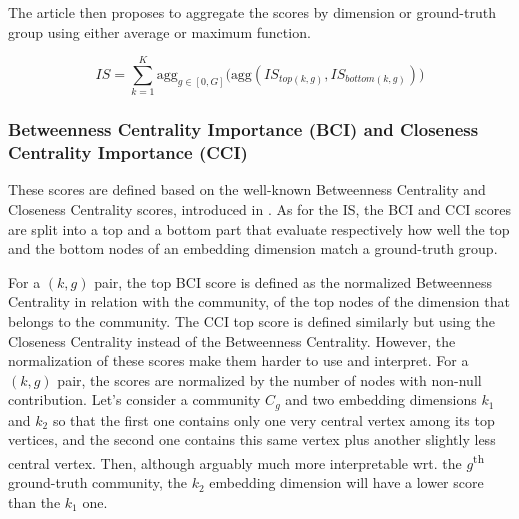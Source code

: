 The article then proposes to aggregate the scores by dimension or ground-truth group using either average or maximum function. %

\begin{equation}
    IS = \sum_{k=1}^K \text{agg}_{g \in [0, G]}\big(\text{agg}(IS_{top(k,g)}, IS_{bottom(k,g)})\big)
\end{equation}

\subsubsection{Betweenness Centrality Importance (BCI) and Closeness Centrality Importance (CCI)}\label{subsec:bci_cci_introduction}
These scores are defined based on the well-known Betweenness Centrality and Closeness Centrality scores, introduced in \cite{bloch2023centrality}.  As for the IS, the BCI and CCI scores are split into a top and a bottom part that evaluate respectively how well the top and the bottom nodes of an embedding dimension match a ground-truth group.

For a $(k, g)$ pair, the top BCI score is defined as the normalized Betweenness Centrality in relation with the community, of the top nodes of the dimension that belongs to the community. The CCI top score is defined similarly but using the Closeness Centrality instead of the Betweenness Centrality.
However, the normalization of these scores make them harder to use and interpret. For a $(k, g)$ pair, the scores are normalized by the number of nodes with non-null contribution. Let's consider a community $C_g$ and two embedding dimensions $k_1$ and $k_2$ so that the first one contains only one very central vertex among its top vertices, and the second one contains this same vertex plus another slightly less central vertex. Then, although arguably much more interpretable wrt. the $g$\textsuperscript{th} ground-truth community, the $k_2$ embedding dimension will have a lower score than the $k_1$ one.

